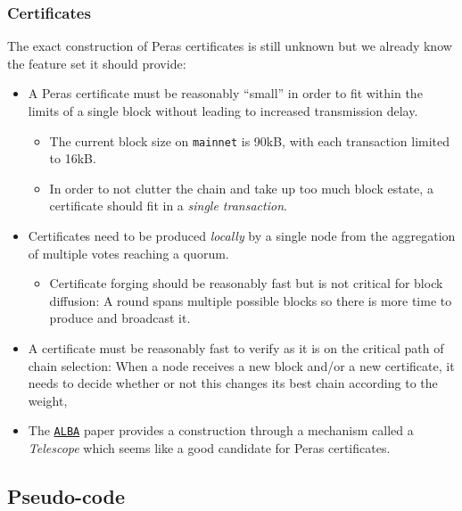 \documentclass[10pt]{article}
\providecommand{\tightlist}{%
  \setlength{\itemsep}{0pt}\setlength{\parskip}{0pt}}
\begin{document}
\subsubsection{Certificates}\label{certificates}

The exact construction of Peras certificates is still unknown but we
already know the feature set it should provide:

\begin{itemize}
\tightlist
\item
  A Peras certificate must be reasonably ``small'' in order to fit
  within the limits of a single block without leading to increased
  transmission delay.

  \begin{itemize}
  \tightlist
  \item
    The current block size on \texttt{mainnet} is 90kB, with each
    transaction limited to 16kB.
  \item
    In order to not clutter the chain and take up too much block estate,
    a certificate should fit in a \emph{single transaction}.
  \end{itemize}
\item
  Certificates need to be produced \emph{locally} by a single node from
  the aggregation of multiple votes reaching a quorum.

  \begin{itemize}
  \tightlist
  \item
    Certificate forging should be reasonably fast but is not critical
    for block diffusion: A round spans multiple possible blocks so there
    is more time to produce and broadcast it.
  \end{itemize}
\item
  A certificate must be reasonably fast to verify as it is on the
  critical path of chain selection: When a node receives a new block
  and/or a new certificate, it needs to decide whether or not this
  changes its best chain according to the weight,
\item
  The
  \href{https://iohk.io/en/research/library/papers/approximate-lower-bound-arguments/}{\color{blue}\texttt{ALBA}}
  paper provides a construction through a mechanism called a
  \emph{Telescope} which seems like a good candidate for Peras
  certificates.
\end{itemize}

\subsection{Pseudo-code}\label{pseudo-code}
\end{document}
